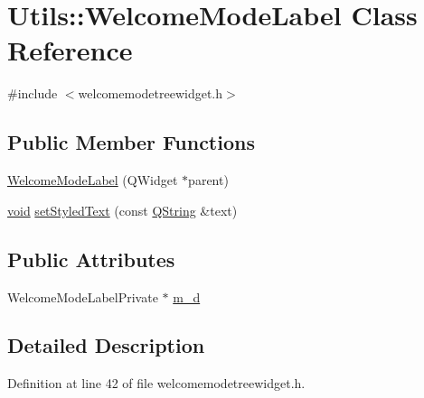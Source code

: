 \hypertarget{class_utils_1_1_welcome_mode_label}{\section{\-Utils\-:\-:\-Welcome\-Mode\-Label \-Class \-Reference}
\label{class_utils_1_1_welcome_mode_label}
}


{\ttfamily \#include $<$welcomemodetreewidget.\-h$>$}

\subsection*{\-Public \-Member \-Functions}
\begin{DoxyCompactItemize}
\item 
\hyperlink{class_utils_1_1_welcome_mode_label_ad83fa7150a17bc8b7079208d1ab21a31}{\-Welcome\-Mode\-Label} (\-Q\-Widget $\ast$parent)
\item 
\hyperlink{group___u_a_v_objects_plugin_ga444cf2ff3f0ecbe028adce838d373f5c}{void} \hyperlink{class_utils_1_1_welcome_mode_label_ab7bf52a3f03d9e057685edcf926150be}{set\-Styled\-Text} (const \hyperlink{group___u_a_v_objects_plugin_gab9d252f49c333c94a72f97ce3105a32d}{\-Q\-String} \&text)
\end{DoxyCompactItemize}
\subsection*{\-Public \-Attributes}
\begin{DoxyCompactItemize}
\item 
\-Welcome\-Mode\-Label\-Private $\ast$ \hyperlink{class_utils_1_1_welcome_mode_label_a1d69ec538fa784b0c5524d325a11f9a5}{m\-\_\-d}
\end{DoxyCompactItemize}


\subsection{\-Detailed \-Description}


\-Definition at line 42 of file welcomemodetreewidget.\-h.



